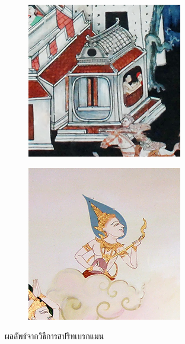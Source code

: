 \documentclass[hidelinks, a4paper,12pt]{article}
\numberwithin{equation}{section}							%
\numberwithin{equation}{section}
\begin{document}
{\begin{figure}[H]
\begin{subfigure}{0.4\linewidth}
			\includegraphics[width=0.8\linewidth]{images/result_ex4/splitbergman_case04.png}			
		\end{subfigure}
		\begin{subfigure}{0.4\linewidth}
			\centering
			\includegraphics[width=0.8\linewidth]{images/result_ex4/splitbergman_case05.png}			
		\end{subfigure}
		\caption{ผลลัพธ์จากวิธีการสปริทเบรกแมน}
	\end{figure}
	\begin{table}[H]
		\centering
		\begin{tabular}[ht]{|c|c|c|c|c|}
			\hline

\end{tabular}
\end{table}}
\end{document}
